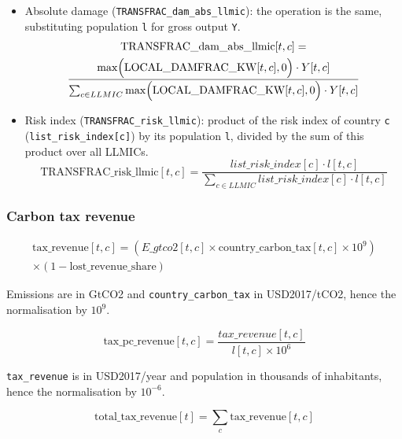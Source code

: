 \documentclass[
]{article}
\begin{document}
\begin{itemize}
\begin{itemize}
\item
  Absolute damage (\texttt{TRANSFRAC\_dam\_abs\_llmic}): the operation
  is the same, substituting population \texttt{l} for gross output
  \texttt{Y}.
  \begin{multline}
    \text{TRANSFRAC\_dam\_abs\_llmic}[t,c] = \\
    \frac{\max \Bigl(\text{LOCAL\_DAMFRAC\_KW}[t,c], 0 \Bigr) \cdot Y[t,c]}{\sum_{c \in LLMIC} \max \Bigl(\text{LOCAL\_DAMFRAC\_KW}[t,c], 0 \Bigr) \cdot Y[t,c] }
    \end{multline}


\item
  Risk index (\texttt{TRANSFRAC\_risk\_llmic}): product of the risk
  index of country \texttt{c} (\texttt{list\_risk\_index{[}c{]}}) by its
  population \texttt{l}, divided by the sum of this product over all
  LLMICs.
  \begin{equation}
    \text{TRANSFRAC\_risk\_llmic}[t,c] = \frac{list\_risk\_index[c] \cdot l[t,c]}{\sum_{c \in LLMIC} list\_risk\_index[c] \cdot l[t,c]}
    \end{equation}

\end{itemize}
\end{itemize}


\subsubsection{Carbon tax revenue}\label{carbon-tax-revenue}

\begin{multline}
 \text{tax\_revenue}[t,c] = \left(E\_gtco2[t,c] \times \text{country\_carbon\_tax}[t,c] \times 10^9 \right) \\
 \times \left(1 - \text{lost\_revenue\_share} \right) 
\end{multline}

Emissions are in GtCO2 and \texttt{country\_carbon\_tax} in USD2017/tCO2, hence the
normalisation by \(10^9\).

\begin{equation}
 \text{tax\_pc\_revenue}[t,c] = \frac{tax\_revenue[t,c]}{l[t,c] \times 10^6} 
\end{equation}


\texttt{tax\_revenue} is in USD2017/year and population in thousands of
inhabitants, hence the normalisation by \(10^{-6}\).

\begin{equation}
 \text{total\_tax\_revenue}[t] = \sum_c \text{tax\_revenue}[t,c]
\end{equation}
\end{document}
